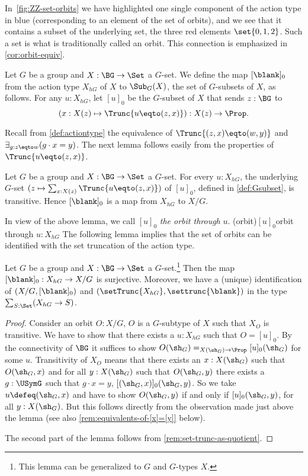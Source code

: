 In~\cref{fig:ZZ-set-orbits} we have highlighted one single component of
the action type in blue (\ie corresponding to an element of the set of orbits),
and we see that it contains a subset of the underlying set,
the three red elements $\set{0,1,2}$.
Such a set is what is traditionally called an orbit.
This connection is emphasized in \cref{cor:orbit-equiv}.

\begin{definition}\label{def:orbit-map}
Let $G$ be a group and $X : \BG\to\Set$ a $G$-set.
We define the map $[\blank]_0$ from the action type $X_{hG}$ of
$X$ to $\Sub_G(X)$, the set of $G$-subsets of $X$, as follows.
For any $u:X_{hG}$, let $[u]_0$ be the $G$-subset of $X$ that
sends $z:\BG$ to
\[
(x:X(z) \mapsto \Trunc{u\eqto(z,x)}) : X(z) \to \Prop.\qedhere
\]
\end{definition}

Recall from \cref{def:actiontype} the equivalence of
$\Trunc{(z,x)\eqto(w,y)}$ and $\exists_{g:z\eqto w}(g\cdot x = y)$.
The next lemma follows easily from the properties of $\Trunc{u\eqto(z,x)}$.

\begin{lemma}\label{lem:[]0-maps-to-X/G}
Let $G$ be a group and $X : \BG\to\Set$ a $G$-set.
For every $u:X_{hG}$, the underlying $G$-set
$(z\mapsto \sum_{x:X(z)}\Trunc{u\eqto(z,x)})$ of $[u]_0$,
defined in \cref{def:Gsubset}, is transitive.
Hence $[\blank]_0$ is a map from $X_{hG}$ to $X/G$.
\end{lemma}

In view of the above lemma, we call $[u]_0$ \emph{the orbit
through} $u$. \glossary(orbit){$[u]_0$}{orbit through $u:X_{hG}$}
The following lemma implies that the set of orbits can 
be identified with the set truncation of the action type.

\begin{lemma}\label{lem:X/G=setTruncX_hG}
  Let $G$ be a group and $X : \BG\to\Set$ a $G$-set.\footnote{%
  This lemma can be generalized to \inftygps $G$ and $G$-types $X$.}
  Then the map $[\blank]_0 :X_{hG}\to X/G $ is surjective.
  Moreover, we have a (unique) identification of
  $(X/G,[\blank]_0)$ and $(\setTrunc{X_{hG}},\settrunc{\blank})$
  in the type $\sum_{S:\Set}(X_{hG}\to S)$.
\end{lemma}

\begin{proof}
  Consider an orbit $O:X/G$, \ie
  $O$ is a $G$-subtype of $X$ such that $X_O$ is transitive. 
  We have to show that there exists a $u:X_{hG}$ such that $O=[u]_0$.
  By the connectivity of $\BG$ it suffices to show 
  $O(\sh_G)=_{X(\sh_G)\to\Prop}[u]_0(\sh_G)$ for some $u$.
  Transitivity of $X_O$ means that there exists an $x:X(\sh_G)$
  such that $O(\sh_G,x)$ and for all $y:X(\sh_G)$ such that
  $O(\sh_G,y)$ there
  exists a $g:\USymG$ such that $g\cdot x = y$, \ie $[(\sh_G,x)]_0(\sh_G,y)$.
  So we take $u\defeq(\sh_G,x)$ and have to show $O(\sh_G,y)$ if and only if
  $[u]_0(\sh_G,y)$, for all $y:X(\sh_G)$. But this follows directly from
  the observation made just above the lemma
  (see also \cref{rem:equivalents-of-[x]=[y]} below).
  
  The second part of the lemma follows from \cref{rem:set-trunc-as-quotient}. 
\end{proof}

